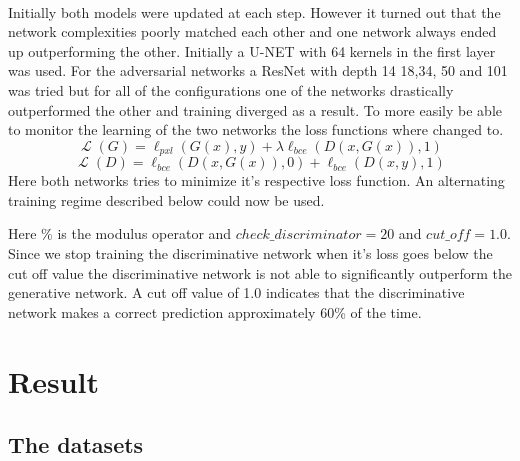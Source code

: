 \documentclass{kththesis}
\DeclareMathOperator{\Lagr}{\mathcal{L}}
\begin{document}
\\
Initially both models were updated at each step. However it turned out that the network complexities poorly matched each other and one network always ended up outperforming the other. Initially a U-NET with 64 kernels in the first layer was used. For the adversarial networks a ResNet with depth 14 18,34, 50 and 101 was tried but for all of the configurations one of the networks drastically outperformed the other and training diverged as a result. To more easily be able to monitor the learning of the two networks the loss functions where changed to.
\begin{equation}
\Lagr(G) = \ell_{pxl}(G(x),y)+\lambda\ell_{bce}(D(x,G(x)), 1)
\end{equation}
\begin{equation}
\Lagr(D) =\ell_{bce}(D(x,G(x)), 0) + \ell_{bce}(D(x,y), 1)
\end{equation}
Here both networks tries to minimize it's respective loss function. An alternating training regime described below could now be used.

Here \% is the modulus operator and $check\_discriminator=20$ and $cut\_off=1.0$. Since we stop training the discriminative network when it's loss goes below the cut off value the discriminative network is not able to significantly outperform the generative network. A cut off value of 1.0 indicates that the discriminative network makes a correct prediction approximately 60\% of the time.\\

\chapter{Result}
\section{The datasets}
\end{document}
